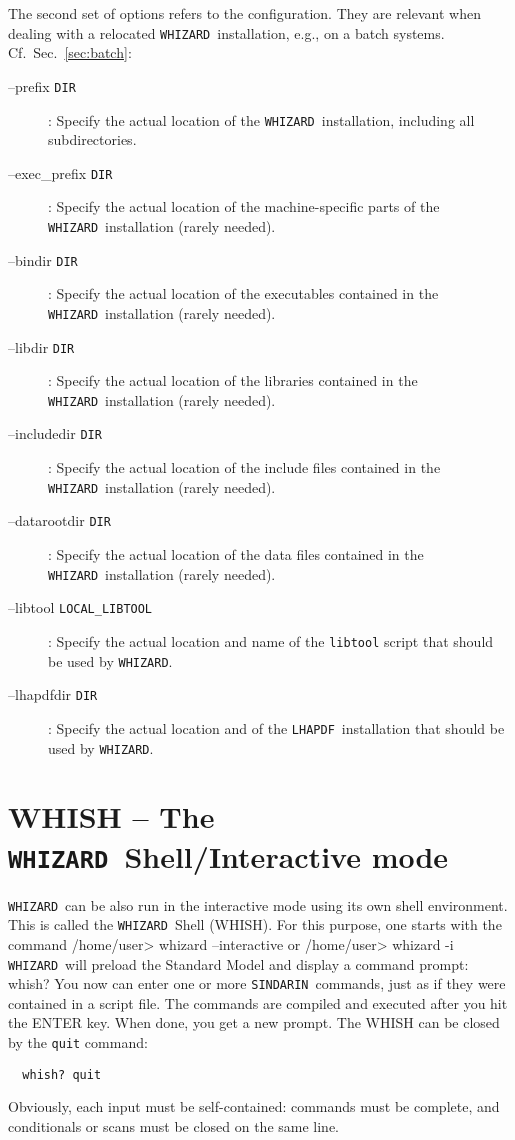 \documentclass[12pt]{book}
\newenvironment{interaction}%
  {\begingroup\small
   \verbatim}%
  {\endverbatim
   \endgroup\noindent}
\newcommand{\ttt}[1]{\texttt{#1}}
\newcommand{\whizard}{\texttt{WHIZARD}}
\newcommand{\lhapdf}{\texttt{LHAPDF}}
\newcommand{\sindarin}{\texttt{SINDARIN}}
\begin{document}
The second set of options refers to the configuration.  They are
relevant when dealing with a relocated \whizard\ installation, e.g.,
on a batch systems.  Cf.\ Sec.~\ref{sec:batch}:
\begin{description}
\item[--prefix \ttt{DIR}]: Specify the actual location of the \whizard\
  installation, including all subdirectories.
\item[--exec\_prefix \ttt{DIR}]:  Specify the actual location of the
  machine-specific parts of the \whizard\ installation (rarely needed).
\item[--bindir \ttt{DIR}]:  Specify the actual location of the
  executables contained in the \whizard\ installation (rarely needed).
\item[--libdir \ttt{DIR}]:  Specify the actual location of the
  libraries contained in the \whizard\ installation (rarely needed).
\item[--includedir \ttt{DIR}]:  Specify the actual location of the
  include files contained in the \whizard\ installation (rarely needed).
\item[--datarootdir \ttt{DIR}]:  Specify the actual location of the
  data files contained in the \whizard\ installation (rarely needed).
\item[--libtool \ttt{LOCAL\_LIBTOOL}]:  Specify the actual location and
  name of the \ttt{libtool} script that should be used by \whizard.
\item[--lhapdfdir \ttt{DIR}]:  Specify the actual location and
  of the \lhapdf\ installation that should be used by \whizard.
\end{description}



\section{WHISH -- The \whizard\ Shell/Interactive mode}
\label{sec:whish}

\whizard\ can be also run in the interactive mode using its own shell
environment. This is called the \whizard\ Shell (WHISH). For this
purpose, one starts with the command
\begin{interaction} 
  /home/user> whizard --interactive 
\end{interaction}
or
\begin{interaction} 
  /home/user> whizard -i 
\end{interaction} 
\whizard\ will preload the Standard Model and display a command
prompt:
\begin{interaction}
  whish?
\end{interaction}
You now can enter one or more \sindarin\ commands, just as if they
were contained in a script file.  The commands are compiled and
executed after you hit the ENTER key.  When done, you get a new
prompt.  The WHISH can be closed by the \texttt{quit} command:
\begin{verbatim}
  whish? quit
\end{verbatim}
Obviously, each input must be self-contained: commands must be
complete, and conditionals or scans must be closed on the same line.
\end{document}

